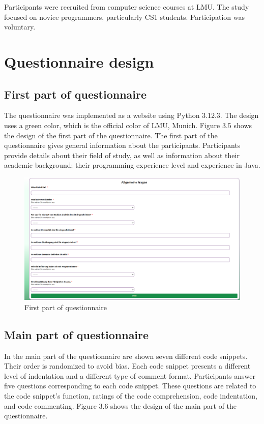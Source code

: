 Participants were recruited from computer science courses at LMU. The study focused on novice programmers, particularly CS1 students. Participation was voluntary.

\section{Questionnaire design}


\subsection{First part of questionnaire}



The questionnaire was implemented as a website using Python 3.12.3. The design uses a green color, which is the official color of LMU, Munich. 
Figure 3.5 shows the design of the first part of the questionnaire. The first part of the questionnaire gives general information about the participants. 
Participants provide details about their field of study, as well as information about their academic background: their programming experience level and experience in Java. 
\begin{figure} [H]
  \centering
  \includegraphics[scale=0.45]{figures/allgemein.png}
  \caption{First part of questionnaire}
  \label{fig:AnhangsChor}
\end{figure}


\subsection{Main part of questionnaire}

In the main part of the questionnaire are shown seven different code snippets. Their order is randomized to avoid bias. Each code snippet presents a different level of indentation and a different type of comment format.
Participants answer five questions corresponding to each code snippet. These questions are related to the code snippet’s function, ratings of the code comprehension, code indentation, and code commenting. Figure 3.6 shows the design of the main part of the questionnaire.


